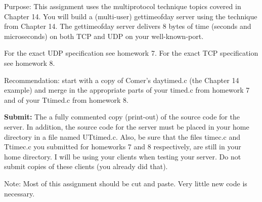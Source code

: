 

\parindent 0pt

Purpose: This assignment uses the multiprotocol technique
topics covered in Chapter 14.
You will build a (multi-user) gettimeofday server
using the technique from Chapter 14.
The gettimeofday server delivers 8 bytes of time (seconds and microseconds)
on both TCP and UDP on your well-known-port.

For the exact UDP specification see homework 7.
For the exact TCP specification see homework 8.

Recommendation: start with a copy of Comer's {\ltt{}daytimed.c}
(the Chapter 14 example)
and merge in the appropriate parts of your {\ltt{}timed.c} from homework 7
and of your {\ltt{}Ttimed.c} from homework 8.

{\bf Submit:} The a fully commented copy (print-out) of the source code for the 
server.
In addition,
the source code for the server must be placed in your home directory
in a file named {\ltt{}UTtimed.c}.
Also, be sure that the files {\ltt{}timec.c} and {\ltt{}Ttimec.c} you
submitted for homeworks 7 and 8 respectively, are still in your home directory.
I will be using your clients when testing your server.
Do not submit copies of these clients (you already did that).

Note: Most of this assignment should be cut and paste.
Very little new code is necessary.
\bye

